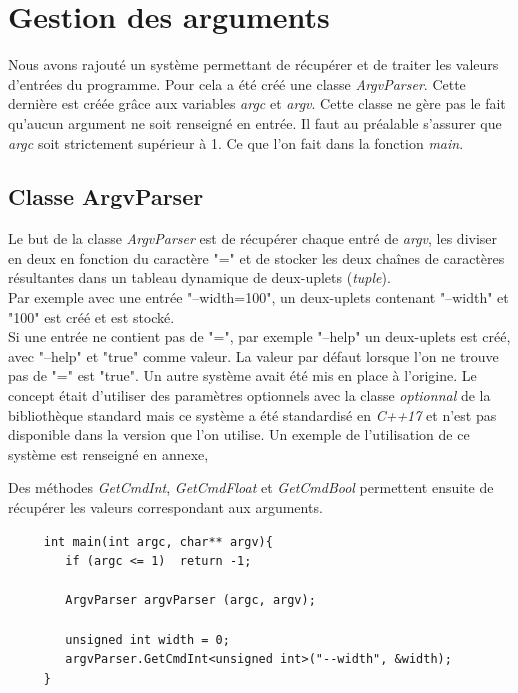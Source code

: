   \section{Gestion des arguments}
  Nous avons rajouté un système permettant de récupérer et de traiter les valeurs d'entrées du programme.
  Pour cela a été créé une classe \textit{ArgvParser}. Cette dernière est créée grâce aux variables \textit{argc} et \textit{argv}. 
  Cette classe ne gère pas le fait qu'aucun argument ne soit renseigné en entrée. Il faut au préalable s'assurer que \textit{argc} soit strictement supérieur à 1. Ce que l'on fait dans la fonction \textit{main}.\\
  
  \subsection{Classe ArgvParser}
  \label{sec:argvparser}
  
  Le but de la classe \textit{ArgvParser} est de récupérer chaque entré de \textit{argv}, les diviser en deux en fonction du caractère "=" et de stocker les deux chaînes de caractères résultantes dans un tableau dynamique de deux-uplets (\textit{tuple}).\\
  
  Par exemple avec une entrée "--width=100", un deux-uplets contenant "--width" et "100" est créé et est stocké.\\
  Si une entrée ne contient pas de "=", par exemple "--help" un deux-uplets est créé, avec "--help" et "true" comme valeur. La valeur par défaut lorsque l'on ne trouve pas de "=" est "true".
  Un autre système avait été mis en place à l'origine. Le concept était d'utiliser des paramètres optionnels
  avec la classe \textit{optionnal} de la bibliothèque standard mais ce système a été standardisé en \textit{C++17} et n'est pas disponible dans la version que l'on utilise. Un exemple de l'utilisation de ce système est renseigné en annexe, 
  
  Des méthodes \textit{GetCmdInt}, \textit{GetCmdFloat} et \textit{GetCmdBool} permettent ensuite de récupérer les valeurs correspondant aux arguments.
  
  \lstset{language=C++}
  \begin{lstlisting}
     int main(int argc, char** argv){
        if (argc <= 1)  return -1;
        
        ArgvParser argvParser (argc, argv);
        
        unsigned int width = 0;
        argvParser.GetCmdInt<unsigned int>("--width", &width);
     }
  \end{lstlisting}
  

